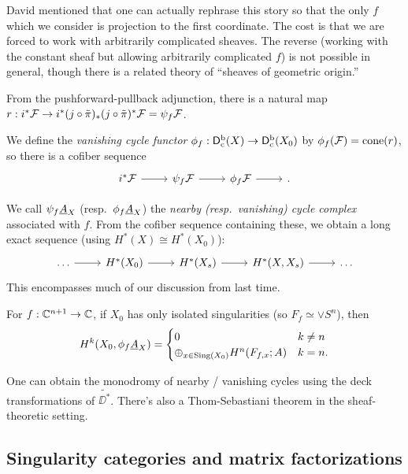 \documentclass{article}
\begin{document}
\begin{rmk}
	David mentioned that one can actually rephrase this story so that the only $f$ which we consider is projection to the first coordinate.
	The cost is that we are forced to work with arbitrarily complicated sheaves.
	The reverse (working with the constant sheaf but allowing arbitrarily complicated $f$) is not possible in general, though there is a related theory of ``sheaves of geometric origin.''
\end{rmk}


From the pushforward-pullback adjunction, there is a natural map $r: i^* \mathcal{F} \to i^* (j \circ \tilde{\pi})_* (j \circ \tilde{\pi})^* \mathcal{F} = \psi_f \mathcal{F}$.

\begin{dfn}
	We define the \emph{vanishing cycle functor} $\phi_f: \mathsf{D}^\mathrm{b}_{\mathrm{c}}(X) \to \mathsf{D}^\mathrm{b}_{\mathrm{c}}(X_0)$ by $\phi_f(\mathcal{F}) = \operatorname{cone}(r)$, so there is a cofiber sequence
	\[
		\begin{tikzcd}
			i^*\Fc \rar & \psi_f \Fc \rar & \phi_f \Fc \rar & {}.
		\end{tikzcd}
	\]
\end{dfn}

We call $\psi_f \underline{A}_X$ (resp.\ $\phi_f \underline{A}_X$) the \emph{nearby (resp.\ vanishing) cycle complex} associated with $f$.
From the cofiber sequence containing these, we obtain a long exact sequence (using $H^*(X) \cong H^*(X_0)$):
\[
	\begin{tikzcd}
		\dots \rar & H^*(X_0) \rar & H^*(X_s) \rar & H^*(X, X_s) \rar & \dots
	\end{tikzcd}
\]
This encompasses much of our discussion from last time.

\begin{prop}
	For $f: \mathbb{C}^{n+1} \to \mathbb{C}$, if $X_0$ has only isolated singularities (so $F_f \simeq \vee S^n$), then
	\[
		H^k(X_0, \phi_f \underline{A}_X) = \begin{cases}
			0 & k \neq n \\
			\oplus_{x \in \operatorname{Sing}(X_0)} H^n(F_{f,x}; A) & k = n.
		\end{cases}
	\]
\end{prop}

\begin{rmk}
	One can obtain the monodromy of nearby / vanishing cycles using the deck transformations of $\tilde{\DD^*}$.
	There's also a Thom-Sebastiani theorem in the sheaf-theoretic setting.
\end{rmk}

\subsection{Singularity categories and matrix factorizations}
\end{document}
